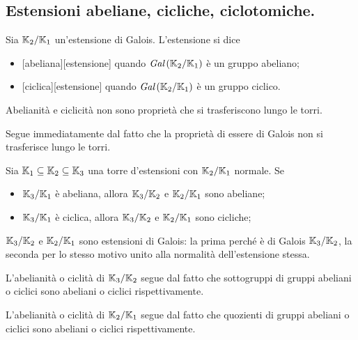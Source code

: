 \subsection{Estensioni abeliane, cicliche, ciclotomiche.}
\label{EstensioniAbelianeCiclicheCiclotomiche}
\begin{Definition}
	Sia $\mathbb{K}_2/\mathbb{K}_1$
	un'estensione di Galois. L'estensione si dice
	\begin{itemize}
		\item {}[abeliana][estensione] quando
		$\textit{Gal} \left ( \mathbb{K}_2/\mathbb{K}_1 \right )$ \`e un gruppo abeliano;
		\item {}[ciclica][estensione] quando
		$\textit{Gal} \left ( \mathbb{K}_2/\mathbb{K}_1 \right )$ \`e un gruppo ciclico.
	\end{itemize}
\end{Definition}
\begin{Theorem}
	Abelianit\`a e ciclicit\`a non sono propriet\`a che si
	trasferiscono lungo le torri.
\end{Theorem}
\Proof
Segue immediatamente dal fatto che la propriet\`a di essere di Galois non
si trasferisce lungo le torri.
\EndProof
\begin{Theorem}
	Sia $\mathbb{K}_1 \subseteq \mathbb{K}_2 \subseteq \mathbb{K}_3$ una torre
	d'estensioni con $\mathbb{K}_2/\mathbb{K}_1$ normale. Se
	\begin{itemize}
		\item $\mathbb{K}_3/\mathbb{K}_1$ \`e abeliana,
		allora $\mathbb{K}_3/\mathbb{K}_2$ e
		$\mathbb{K}_2/\mathbb{K}_1$ sono abeliane;
		\item $\mathbb{K}_3/\mathbb{K}_1$ \`e ciclica,
		allora $\mathbb{K}_3/\mathbb{K}_2$ e
		$\mathbb{K}_2/\mathbb{K}_1$ sono cicliche;
	\end{itemize}
\end{Theorem}
\Proof
$\mathbb{K}_3/\mathbb{K}_2$ e
$\mathbb{K}_2/\mathbb{K}_1$ sono estensioni di Galois: la prima
perch\'e \`e di Galois $\mathbb{K}_3/\mathbb{K}_2$, la seconda
per lo stesso motivo unito alla normalit\`a dell'estensione stessa.
\par
L'abelianit\`a o ciclit\`a di
$\mathbb{K}_3/\mathbb{K}_2$ segue dal fatto che sottogruppi di
gruppi abeliani o ciclici sono abeliani o ciclici rispettivamente.
\par
L'abelianit\`a o ciclit\`a di
$\mathbb{K}_2/\mathbb{K}_1$ segue dal fatto che quozienti di
gruppi abeliani o ciclici sono abeliani o ciclici rispettivamente.
